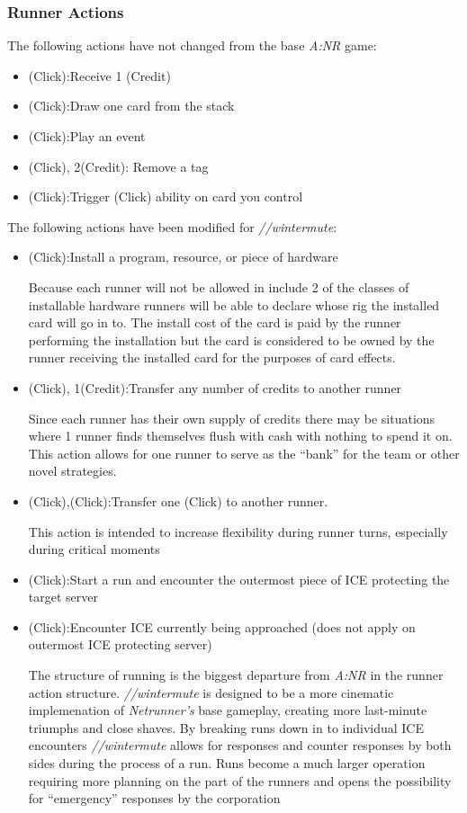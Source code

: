 \documentclass[titlepage]{article}
\begin{document}
\subsubsection{Runner Actions}

The following actions have not changed from the base \emph{A:NR} game:

\begin{itemize}
	\item (Click):Receive 1 (Credit)
	\item (Click):Draw one card from the stack
	\item (Click):Play an event
	\item (Click), 2(Credit): Remove a tag
	\item (Click):Trigger (Click) ability on card you control
\end{itemize}

The following actions have been modified for \emph{//wintermute}:

\begin{itemize}
	\item (Click):Install a program, resource, or piece of hardware

		Because each runner will not be allowed in include 2 of the classes of installable hardware runners will be able to declare whose rig the installed card will go in to. The install cost of the card is paid by the runner performing the installation but the card is considered to be owned by the runner receiving the installed card for the purposes of card effects. 
	\item (Click), 1(Credit):Transfer any number of credits to another runner

		Since each runner has their own supply of credits there may be situations where 1 runner finds themselves flush with cash with nothing to spend it on. This action allows for one runner to serve as the ``bank'' for the team or other novel strategies.
	\item (Click),(Click):Transfer one (Click) to another runner.

		This action is intended to increase flexibility during runner turns, especially during critical moments
	\item (Click):Start a run and encounter the outermost piece of ICE protecting the target server
	\item (Click):Encounter ICE currently being approached (does not apply on outermost ICE protecting server)

		The structure of running is the biggest departure from \emph{A:NR} in the runner action structure. \emph{//wintermute} is designed to be a more cinematic implemenation of \emph{Netrunner's} base gameplay, creating more last-minute triumphs and close shaves. By breaking runs down in to individual ICE encounters \emph{//wintermute} allows for responses and counter responses by both sides during the process of a run. Runs become a much larger operation requiring more planning on the part of the runners and opens the possibility for ``emergency'' responses by the corporation
\end{itemize}
\end{document}
